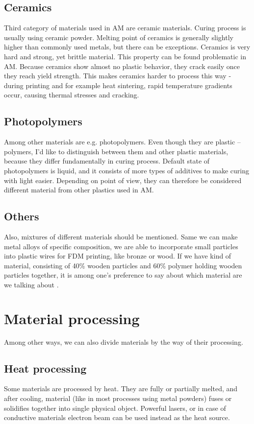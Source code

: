 \documentclass[a4paper, 11pt, reqno]{report}
\begin{document}
\subsection{Ceramics}
Third category of materials used in AM are ceramic materials. Curing process is usually using ceramic powder. Melting point of ceramics is generally slightly higher than commonly used metals, but there can be exceptions. Ceramics is very hard and strong, yet brittle material. This property can be found problematic in AM. Because ceramics show almost no plastic behavior, they crack easily once they reach yield strength. This makes ceramics harder to process this way - during printing and for example heat sintering, rapid temperature gradients occur, causing thermal stresses and cracking.
\subsection{Photopolymers}
Among other materials are e.g. photopolymers. Even though they are plastic – polymers, I'd like to distinguish between them and other plastic materials, because they differ fundamentally in curing process. Default state of photopolymers is liquid, and it consists of more types of additives to make curing with light easier. Depending on point of view, they can therefore be considered different material from other plastics used in AM.
\subsection{Others}
Also, mixtures of different materials should be mentioned. Same we can make metal alloys of specific composition, we are able to incorporate small particles into plastic wires for FDM printing, like bronze or wood. If we have kind of material, consisting of 40\% wooden particles and 60\% polymer holding wooden  particles together, it is among one’s preference to say about which material are we talking about \cite{WoodenFilament}.
\section{Material processing}
Among other ways, we can also divide materials by the way of their processing.
\subsection{Heat processing} Some materials are processed by heat. They are fully or partially melted, and after cooling, material (like in most processes using metal powders) fuses or solidifies together into single physical object. Powerful lasers, or in case of conductive materials electron beam can be used instead as the heat source.
\end{document}
